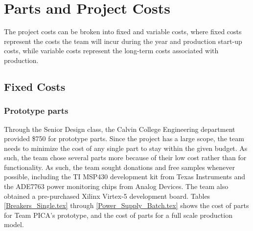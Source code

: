 \section{Parts and Project Costs}
\label{sec:parts_and_costs}

The project costs can be broken into fixed and variable costs, where fixed costs represent the costs the team will incur during the year and production start-up costs, while variable costs represent the long-term costs associated with production.

\subsection{Fixed Costs}
\subsubsection{Prototype parts}
Through the Senior Design class, the Calvin College Engineering department provided \$750 for prototype parts. Since the project has a large scope, the team needs to minimize the cost of any single part to stay within the given budget. As such, the team chose several parts more because of their low cost rather than for functionality. As such, the team sought donations and free samples whenever possible, including the TI MSP430 development kit from Texas Instruments and the ADE7763 power monitoring chips from Analog Devices. The team also obtained a pre-purchased Xilinx Virtex-5 development board. Tables \ref{Breakers_Single.tex} through \ref{Power_Supply_Batch.tex} shows the cost of parts for Team PICA's prototype, and the cost of parts for a full scale production model. 






